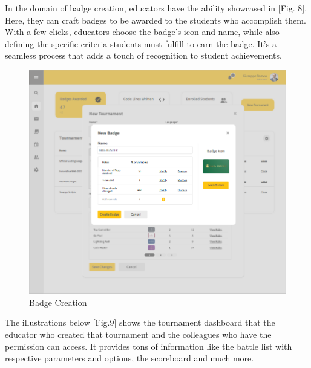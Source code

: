 \documentclass[12pt,oneside,a4paper]{article}
\begin{document}
\pagebreak

\begin{flushleft}
In the domain of badge creation, educators have the ability showcased in [Fig. 8]. Here, they can craft badges to be awarded to the students who accomplish them. With a few clicks, educators choose the badge's icon and name, while also defining the specific criteria students must fulfill to earn the badge. It's a seamless process that adds a touch of recognition to student achievements.    
\end{flushleft}

\begin{figure}[htbp]
    \centering
    \includegraphics[width=1\linewidth]{Images/Interfaces/Educator Interfaces/CreateBadge.png}
    \caption{Badge Creation}
    \label{fig:enter-label}
\end{figure}

\pagebreak

\begin{flushleft}
The illustrations below [Fig.9] shows the tournament dashboard that the educator who created that tournament and the colleagues who have the permission can access. It provides tons of information like the battle list with respective parameters and options, the scoreboard and much more.   
\end{flushleft}
\end{document}
